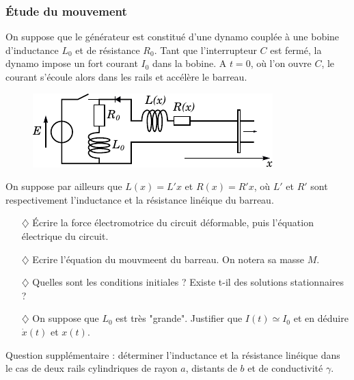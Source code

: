 \documentclass{report}
\begin{document}
\subsubsection*{Étude du mouvement}

On suppose que le générateur est constitué d'une dynamo couplée à une bobine d'inductance $L_0$ et de résistance $R_0$. Tant que l'interrupteur $C$ est fermé, la dynamo impose un fort courant $I_0$ dans la bobine. A $t=0$, où l'on ouvre $C$, le courant s'écoule alors dans les rails et accélère le barreau. 

\begin{figure}[h!]
\centering
		\includegraphics[scale=1]{induction2.pdf}
\end{figure}

On suppose par ailleurs que $L(x)=L'x$ et $R(x)=R'x$, où $L'$ et $R'$ sont respectivement l'inductance et la résistance linéique du barreau.

\begin{itemize}

	\item[$\diamondsuit$] Écrire la force électromotrice du circuit déformable, puis l'équation électrique du circuit. 
	
	\item[$\diamondsuit$] Ecrire l'équation du mouvmeent du barreau. On notera sa masse $M$. 
	
	\item[$\diamondsuit$] Quelles sont les conditions initiales ? Existe t-il des solutions stationnaires ?
	
	\item[$\diamondsuit$] On suppose que $L_0$ est très "grande". Justifier que $I(t)\simeq I_0$ et en déduire $\dot{x}(t)$ et $x(t)$.

\end{itemize}

Question supplémentaire : déterminer l'inductance et la résistance linéique dans le cas de deux rails cylindriques de rayon $a$, distants de $b$ et de conductivité $\gamma$.
\end{document}
